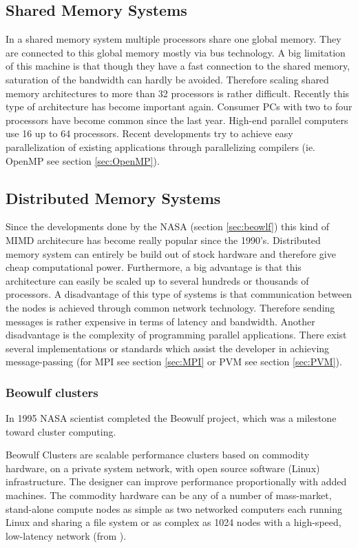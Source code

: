 \subsection{Shared Memory Systems}
\label{sec:sharedmemorysystems}
In a shared memory system multiple processors share one global
memory. They are connected to this global memory mostly via bus
technology. A big limitation of this machine is that though they have
a fast connection to the shared memory, saturation of the bandwidth can
hardly be avoided. Therefore scaling shared memory architectures to
more than 32 processors is rather difficult. Recently this type of
architecture has become important again. Consumer PCs with two to four
processors have become common since the last year. High-end parallel
computers use 16 up to 64 processors. Recent developments try to
achieve easy parallelization of existing applications through
parallelizing compilers (ie. OpenMP see section \ref{sec:OpenMP}).

\subsection{Distributed Memory Systems}

Since the developments done by the NASA (section \ref{sec:beowlf})
this kind of MIMD architecure has become really popular since the 1990's.
Distributed memory system can
entirely be build out of stock hardware and therefore give cheap
computational power. Furthermore, a big advantage is that this
architecture can easily be scaled up to several hundreds or thousands
of processors. A disadvantage of this type of systems is that
communication between the nodes is achieved through common network
technology. Therefore sending messages is rather expensive in terms of
latency and bandwidth. Another disadvantage is the complexity of
programming parallel applications. There exist several implementations
or standards which assist the developer in achieving message-passing
(for MPI see section \ref{sec:MPI} or PVM see section \ref{sec:PVM}).

\subsubsection{Beowulf clusters}
In 1995 NASA scientist completed the Beowulf project, which was a
milestone toward cluster computing.

Beowulf Clusters are scalable performance clusters based on commodity
hardware, on a private system network, with open source software
(Linux) infrastructure. The designer can improve performance
proportionally with added machines. The commodity hardware can be any
of a number of mass-market, stand-alone compute nodes as simple as two
networked computers each running Linux and sharing a file system or as
complex as 1024 nodes with a high-speed, low-latency network (from
\cite{beowulfHP}).

